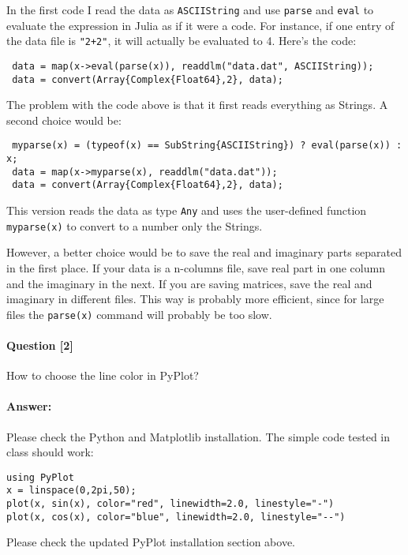 In the first code I read the data as \texttt{ASCIIString} and use \texttt{parse} and \texttt{eval} to evaluate the expression in Julia as if it were a code. For instance, if one entry of the data file is \texttt{"2+2"}, it will actually be evaluated to 4. Here's the code:

\begin{verbatim}
 data = map(x->eval(parse(x)), readdlm("data.dat", ASCIIString));
 data = convert(Array{Complex{Float64},2}, data);
\end{verbatim}

The problem with the code above is that it first reads everything as Strings. A second choice would be:

\begin{verbatim}
 myparse(x) = (typeof(x) == SubString{ASCIIString}) ? eval(parse(x)) : x;
 data = map(x->myparse(x), readdlm("data.dat"));
 data = convert(Array{Complex{Float64},2}, data);
\end{verbatim}

This version reads the data as type \texttt{Any} and uses the user-defined function \texttt{myparse(x)} to convert to a number only the Strings.

However, a better choice would be to save the real and imaginary parts separated in the first place. If your data is a n-columns file, save real part in one column and the imaginary in the next. If you are saving matrices, save the real and imaginary in different files. This way is probably more efficient, since for large files the \texttt{parse(x)} command will probably be too slow.


\paragraph*{Question [2]} How to choose the line color in PyPlot?

\paragraph*{Answer:} Please check the Python and Matplotlib installation. The simple code tested in class should work:

\begin{verbatim}
using PyPlot
x = linspace(0,2pi,50);
plot(x, sin(x), color="red", linewidth=2.0, linestyle="-")
plot(x, cos(x), color="blue", linewidth=2.0, linestyle="--")
\end{verbatim}

Please check the updated PyPlot installation section above.

